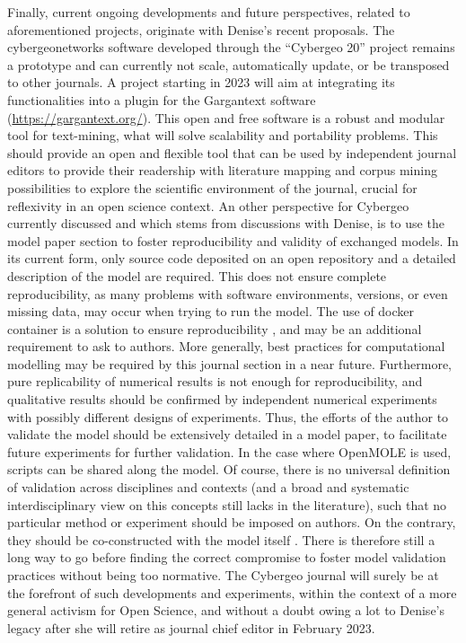 \documentclass[11pt]{article}
\begin{document}
Finally, current ongoing developments and future perspectives, related to aforementioned projects, originate with Denise’s recent proposals. The cybergeonetworks software developed through the ``Cybergeo 20'' project remains a prototype and can currently not scale, automatically update, or be transposed to other journals. A project starting in 2023 will aim at integrating its functionalities into a plugin for the Gargantext software (\url{https://gargantext.org/}). This open and free software is a robust and modular tool for text-mining, what will solve scalability and portability problems. This should provide an open and flexible tool that can be used by independent journal editors to provide their readership with literature mapping and corpus mining possibilities to explore the scientific environment of the journal, crucial for reflexivity in an open science context. An other perspective for Cybergeo currently discussed and which stems from discussions with Denise, is to use the model paper section to foster reproducibility and validity of exchanged models. In its current form, only source code deposited on an open repository and a detailed description of the model are required. This does not ensure complete reproducibility, as many problems with software environments, versions, or even missing data, may occur when trying to run the model. The use of docker container is a solution to ensure reproducibility \citep{boettiger2015introduction}, and may be an additional requirement to ask to authors. More generally, best practices for computational modelling \citep{stodden2014best} may be required by this journal section in a near future. Furthermore, pure replicability of numerical results is not enough for reproducibility, and qualitative results should be confirmed by independent numerical experiments with possibly different designs of experiments. Thus, the efforts of the author to validate the model should be extensively detailed in a model paper, to facilitate future experiments for further validation. In the case where OpenMOLE is used, scripts can be shared along the model. Of course, there is no universal definition of validation across disciplines and contexts (and a broad and systematic interdisciplinary view on this concepts still lacks in the literature), such that no particular method or experiment should be imposed on authors. On the contrary, they should be co-constructed with the model itself \citep{chapron2022co}. There is therefore still a long way to go before finding the correct compromise to foster model validation practices without being too normative. The Cybergeo journal will surely be at the forefront of such developments and experiments, within the context of a more general activism for Open Science, and without a doubt owing a lot to Denise’s legacy after she will retire as journal chief editor in February 2023.
\end{document}
